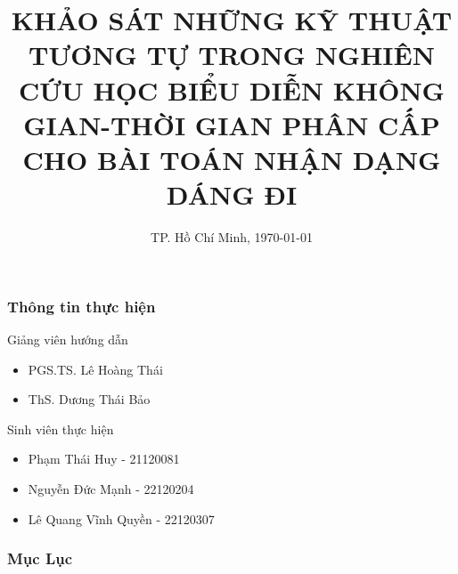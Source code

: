 \documentclass{beamer}
\begin{document}
\title[Báo cáo đồ án]{KHẢO SÁT NHỮNG KỸ THUẬT TƯƠNG TỰ TRONG NGHIÊN CỨU HỌC BIỂU DIỄN KHÔNG GIAN-THỜI GIAN PHÂN CẤP CHO BÀI TOÁN NHẬN DẠNG DÁNG ĐI}
\author[Sinh Trắc học]{}
\date[\today]{TP. Hồ Chí Minh, \today}
\begin{frame}[plain]
    \maketitle
\end{frame}
\begin{frame}
    \frametitle{Thông tin thực hiện}
    \begin{block}{Giảng viên hướng dẫn}
        \begin{itemize}
            \item PGS.TS. Lê Hoàng Thái
            \item ThS. Dương Thái Bảo
        \end{itemize}
    \end{block}
    \vspace{1cm}
    \begin{block}{Sinh viên thực hiện}
        \begin{itemize}
            \item Phạm Thái Huy - 21120081
            \item Nguyễn Đức Mạnh - 22120204
            \item Lê Quang Vĩnh Quyền - 22120307
        \end{itemize}
    \end{block}
\end{frame}
\begin{frame}
    \frametitle{Mục Lục}
    \tableofcontents[hideallsubsections]
\end{frame}
\end{document}

